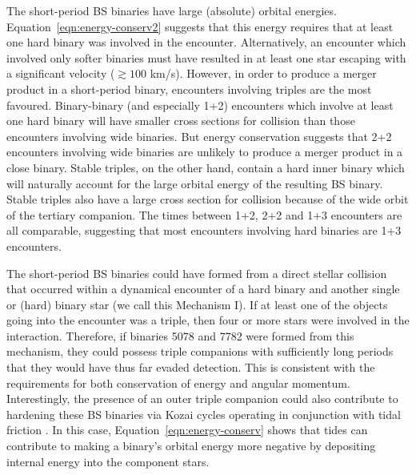 \begin{enumerate}
The short-period BS binaries have large (absolute) orbital energies.
Equation~\ref{eqn:energy-conserv2} suggests that this energy requires
that at least one hard binary was involved in the encounter.
Alternatively, an encounter which involved only softer binaries must
have resulted in at least one star escaping with a significant
velocity ($\gtrsim 100$ km/s).  However, in order to produce a merger
product in a short-period binary, encounters involving triples
are the most favoured.  Binary-binary (and especially 1+2) encounters
which involve at least one hard binary will have smaller
cross sections for collision than those encounters involving wide
binaries.  But energy conservation suggests that 2+2 encounters
involving wide binaries are unlikely to produce a merger product in a close
binary.  Stable triples, on the other hand, contain a hard inner
binary \citep{mardling01} which will naturally account for the large
orbital energy of 
the resulting BS binary.  Stable triples also have a large cross
section for collision because of the wide orbit of the tertiary
companion.  The times between 1+2, 2+2 and 1+3 
encounters are all comparable, suggesting that most encounters
involving hard binaries are 1+3 encounters. 

The short-period BS binaries could have formed from a
direct stellar collision that occurred within a dynamical
encounter of a hard binary and another single or (hard) binary star
(we call this Mechanism I).  If at least one of the objects going into
the encounter was a triple, then four or more stars were involved in
the interaction.  Therefore, if binaries 5078 
and 7782 were formed from this mechanism, they could 
possess triple companions with sufficiently long periods that they
would have thus far evaded detection.  This is consistent with the
requirements for both conservation of energy and angular momentum.  
Interestingly, the presence of an outer triple companion could also
contribute to hardening these BS 
binaries via Kozai cycles operating in conjunction with tidal friction
\citep{fabrycky07}.  In this case, Equation~\ref{eqn:energy-conserv}
shows that tides can contribute to making a binary's orbital energy
more negative by depositing internal energy into the component stars.


\end{enumerate}
